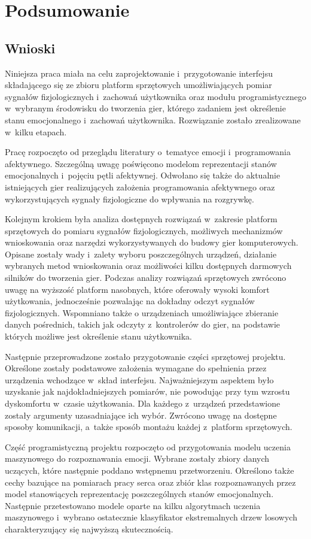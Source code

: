 \chapter{Podsumowanie}
\label{cha:podsumowanie}
\section{Wnioski}
Niniejsza praca miała na celu zaprojektowanie i~przygotowanie interfejsu składającego się ze zbioru platform sprzętowych umożliwiających pomiar sygnałów fizjologicznych i~zachowań użytkownika oraz modułu programistycznego w~wybranym środowisku do tworzenia gier, którego zadaniem jest określenie stanu emocjonalnego i~zachowań użytkownika. Rozwiązanie zostało zrealizowane w~kilku etapach.

Pracę rozpoczęto od przeglądu literatury o~tematyce emocji i~programowania afektywnego. Szczególną uwagę poświęcono modelom reprezentacji stanów emocjonalnych i~pojęciu pętli afektywnej. Odwołano się także do aktualnie istniejących gier realizujących założenia programowania afektywnego oraz wykorzystujących sygnały fizjologiczne do wpływania na rozgrywkę.

Kolejnym krokiem była analiza dostępnych rozwiązań w~zakresie platform sprzętowych do pomiaru sygnałów fizjologicznych, możliwych mechanizmów wnioskowania oraz narzędzi wykorzystywanych do budowy gier komputerowych. Opisane zostały wady i~zalety wyboru poszczególnych urządzeń, działanie wybranych metod wnioskowania oraz możliwości kilku dostępnych darmowych silników do tworzenia gier. Podczas analizy rozwiązań sprzętowych zwrócono uwagę na wyższość platform nasobnych, które oferowały wysoki komfort użytkowania, jednocześnie pozwalając na dokładny odczyt sygnałów fizjologicznych. Wspomniano także o urządzeniach umożliwiające zbieranie danych pośrednich, takich jak odczyty z~kontrolerów do gier, na podstawie których możliwe jest określenie stanu użytkownika.

Następnie przeprowadzone zostało przygotowanie części sprzętowej projektu. Określone zostały podstawowe założenia wymagane do spełnienia przez urządzenia wchodzące w~skład interfejsu. Najważniejszym aspektem było uzyskanie jak najdokładniejszych pomiarów, nie powodując przy tym wzrostu dyskomfortu w~czasie użytkowania. Dla każdego z~urządzeń przedstawione zostały argumenty uzasadniające ich wybór. Zwrócono uwagę na dostępne sposoby komunikacji, a~także sposób montażu każdej z~platform sprzętowych.

Część programistyczną projektu rozpoczęto od przygotowania modelu uczenia maszynowego do rozpoznawania emocji. Wybrane zostały zbiory danych uczących, które następnie poddano wstępnemu przetworzeniu. Określono także cechy bazujące na pomiarach pracy serca oraz zbiór klas rozpoznawanych przez model stanowiących reprezentację poszczególnych stanów emocjonalnych. Następnie przetestowano modele oparte na kilku algorytmach uczenia maszynowego i~wybrano ostatecznie klasyfikator ekstremalnych drzew losowych charakteryzujący się najwyższą skutecznością.


